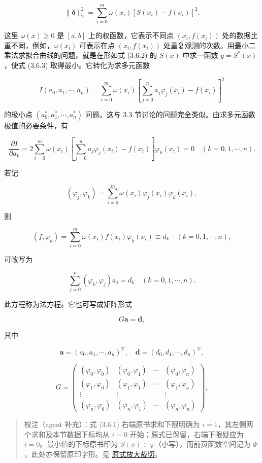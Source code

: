 \documentclass[
  10pt,
  fontset=fandol]{ctexart}
\begin{document}
\[
\|\boldsymbol\delta\|_2^2=\sum_{i=0}^m\omega(x_i)[S(x_i)-f(x_i)]^2.\tag{3.6.3}
\]

这里 \(\omega(x)\geqslant0\) 是 \([a,b]\) 上的权函数，它表示不同点 \((x_i,f(x_i))\) 处的数据比重不同，例如，\(\omega(x_i)\) 可表示在点 \((x_i,f(x_i))\) 处重复观测的次数。用最小二乘法求拟合曲线的问题，就是在形如式 (3.6.2) 的 \(S(x)\) 中求一函数 \(y=S^*(x)\)，使式 (3.6.3) 取得最小。它转化为求多元函数

\[
I(a_0,a_1,\cdots,a_n)=\sum_{i=0}^m\omega(x_i)\left[\sum_{j=0}^na_j\varphi_j(x_i)-f(x_i)\right]^2\tag{3.6.4}
\]

的极小点 \((a_0^*,a_1^*,\cdots,a_n^*)\) 问题。这与 3.3 节讨论的问题完全类似。由求多元函数极值的必要条件，有

\[
\frac{\partial I}{\partial a_k}=2\sum_{i=0}^m\omega(x_i)\left[\sum_{j=0}^na_j\varphi_j(x_i)-f(x_i)\right]\varphi_k(x_i)=0\quad(k=0,1,\cdots,n).
\]

若记

\[
(\varphi_j,\varphi_k)=\sum_{i=0}^m\omega(x_i)\varphi_j(x_i)\varphi_k(x_i),\tag{3.6.5}
\]

则

\[
(f,\varphi_k)=\sum_{i=0}^m\omega(x_i)f(x_i)\varphi_k(x_i)\equiv d_k\quad(k=0,1,\cdots,n),
\]

可改写为

\[
\sum_{j=0}^n(\varphi_k,\varphi_j)a_j=d_k\quad(k=0,1,\cdots,n).\tag{3.6.6}
\]

此方程称为法方程。它也可写成矩阵形式

\[
G\boldsymbol a=\boldsymbol d,
\]

其中

\[
\boldsymbol a=(a_0,a_1,\cdots,a_n)^{\mathrm T},\quad\boldsymbol d=(d_0,d_1,\cdots,d_n)^{\mathrm T},
\]

\[
G=\begin{pmatrix}
(\varphi_0,\varphi_0)&(\varphi_0,\varphi_1)&\cdots&(\varphi_0,\varphi_n)\\
(\varphi_1,\varphi_0)&(\varphi_1,\varphi_1)&\cdots&(\varphi_1,\varphi_n)\\
\vdots&\vdots&&\vdots\\
(\varphi_n,\varphi_0)&(\varphi_n,\varphi_1)&\cdots&(\varphi_n,\varphi_n)
\end{pmatrix},\tag{3.6.7}
\]

\begin{quote}
校注（agent 补充）：式 (3.6.1) 右端原书求和下限明确为 \(i=1\)，其左侧两个求和及本节数据下标均从 \(i=0\) 开始；原式已保留，右端下限疑应为 \(i=0\)。最小值的下标原书印为 \(S(x)\in\varphi\)（小写），而前页函数空间记为 \(\Phi\)，此处亦保留原印字形。见 \href{../assets/ch03b/p079-minimum-formula.png}{原式放大裁切}。
\end{quote}
\end{document}
